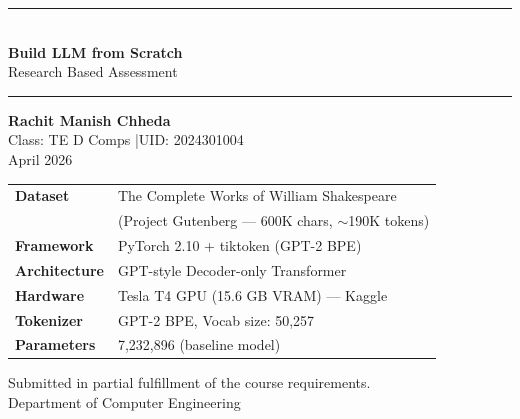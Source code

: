 \documentclass[12pt,a4paper]{article}
\begin{document}

\begin{titlepage}
  \thispagestyle{empty}
  \centering
  \vspace*{1cm}

  {\color{navyblue}\rule{\linewidth}{2.5pt}}\\[0.5cm]
  {\Huge\bfseries\color{black} Build LLM from Scratch}\\[0.4cm]
  {\Large\color{navyblue} Research Based Assessment}\\[0.2cm]
  {\color{navyblue}\rule{\linewidth}{2.5pt}}

  \vspace{1.2cm}

  \begin{tcolorbox}[colback=lightblue!40, colframe=navyblue, boxrule=0.8pt,
                    left=14pt, right=14pt, top=10pt, bottom=10pt, width=0.85\textwidth]
    \centering
    {\Large\bfseries\color{black} Rachit Manish Chheda}\\[6pt]
    {\normalsize\color{black} Class: TE D Comps \quad|\quad UID: 2024301004}\\[8pt]
    {\small\color{black} April 2026}
  \end{tcolorbox}

  \vspace{0.9cm}

  \begin{tcolorbox}[colback=white, colframe=navyblue, boxrule=0.6pt,
                    left=14pt, right=14pt, top=8pt, bottom=8pt]
    \centering
    \renewcommand{\arraystretch}{1.4}
    \begin{tabular}{@{}ll@{}}
      \textbf{Dataset}      & The Complete Works of William Shakespeare \\
                            & (Project Gutenberg — 600K chars, $\sim$190K tokens)\\
      \textbf{Framework}    & PyTorch 2.10 + tiktoken (GPT-2 BPE) \\
      \textbf{Architecture} & GPT-style Decoder-only Transformer \\
      \textbf{Hardware}     & Tesla T4 GPU (15.6 GB VRAM) — Kaggle \\
      \textbf{Tokenizer}    & GPT-2 BPE, Vocab size: 50,257 \\
      \textbf{Parameters}   & 7,232,896 (baseline model) \\
    \end{tabular}
  \end{tcolorbox}

  \vfill
  {\small\color{black}
  Submitted in partial fulfillment of the course requirements.\\
  Department of Computer Engineering}
\end{titlepage}
\end{document}
